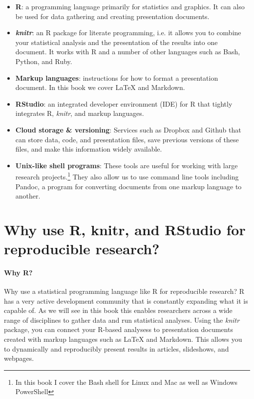 \begin{itemize}
    \item {\bf{R}}: a programming language primarily for statistics and graphics. It can also be used for data gathering and creating presentation documents.
    
    \item {\bf{{\emph{knitr}}}}: an R package for literate programming, i.e. it allows you to combine your statistical analysis and the presentation of the results into one document. It works with R and a number of other languages such as Bash, Python, and Ruby.
    
    \item {\bf{Markup languages}}: instructions for how to format a presentation document. In this book we cover LaTeX and Markdown.  
    
    \item {\bf{RStudio}}: an integrated developer environment (IDE) for R that tightly integrates R, {\emph{knitr}}, and markup languages.
    
    \item {\bf{Cloud storage \& versioning}}: Services such as Dropbox and Github that can store data, code, and presentation files, save previous versions of these files, and make this information widely available.
    
    \item {\bf{Unix-like shell programs}}: These tools are useful for working with large research projects.\footnote{In this book I cover the Bash shell for Linux and Mac as well as Windows PowerShell} They also allow us to use command line tools including Pandoc, a program for converting documents from one markup language to another.
\end{itemize}


\section{Why use R, knitr, and RStudio for reproducible research?}

\paragraph{Why R?}
Why use a statistical programming language like R for reproducible research? R has a very active development community that is constantly expanding what it is capable of. As we will see in this book this enables researchers across a wide range of disciplines to gather data and run statistical analyses. Using the {\emph{knitr}} package, you can connect your R-based analysess to presentation documents created with markup languages such as LaTeX and Markdown. This allows you to dynamically and reproducibly present results in articles, slideshows, and webpages. 

